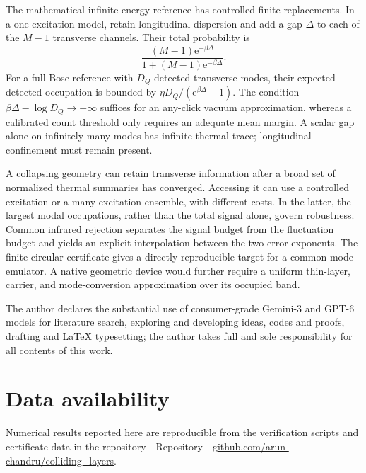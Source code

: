 \documentclass[aps,pra,reprint,superscriptaddress,longbibliography]{revtex4-2}
\newcommand{\ee}{\mathrm e}
\begin{document}
The mathematical infinite-energy reference has controlled finite
replacements. In a one-excitation model, retain longitudinal dispersion
and add a gap $\Delta$ to each of the $M-1$ transverse channels. Their
total probability is
\begin{equation}
 \frac{(M-1)\ee^{-\beta\Delta}}
             {1+(M-1)\ee^{-\beta\Delta}}.
 \label{sgt:main:gapone}
\end{equation}
For a full Bose reference with $D_Q$ detected transverse modes,
their expected detected occupation is bounded by
$\eta D_Q/(\ee^{\beta\Delta}-1)$. The condition
$\beta\Delta-\log D_Q\to+\infty$ suffices for an any-click vacuum
approximation, whereas a calibrated
count threshold only requires an adequate mean margin. A scalar gap
alone on infinitely many modes has infinite thermal trace; longitudinal
confinement must remain present.

A collapsing geometry can
retain transverse information after a broad set of normalized thermal
summaries has converged. Accessing it can use a controlled excitation
or a many-excitation ensemble, with different costs. In the latter,
the largest modal occupations, rather than the total signal alone,
govern robustness. Common infrared rejection separates the signal
budget from the fluctuation budget and yields an explicit interpolation
between the two error exponents. The finite circular certificate gives
a directly reproducible target for a common-mode emulator. A native
geometric device would further require a uniform thin-layer, carrier,
and mode-conversion approximation over its occupied band.

\begin{acknowledgments}
The author declares the substantial use of consumer-grade Gemini-3 and GPT-6 models for literature search, exploring and developing ideas, codes and proofs, drafting and LaTeX typesetting; the author takes full and sole responsibility for all contents of this work.
\end{acknowledgments}

\section*{Data availability}
Numerical results reported here are reproducible from the verification
scripts and certificate data in the repository - Repository - 
\href{https://github.com/arun-chandru/colliding_layers}{github.com/arun-chandru/colliding\_layers}.


\appendix
\end{document}
